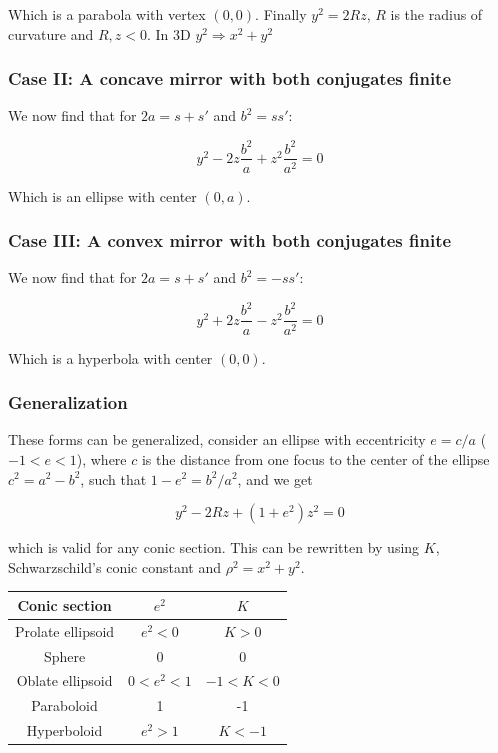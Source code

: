\documentclass[a4paper]{article}
\begin{document}
Which is a parabola with vertex $(0,0)$. Finally $y^2=2Rz$, $R$ is the radius of curvature and $R, z<0$. In 3D $y^2\Rightarrow x^2+y^2$ 

\subsubsection*{Case II: A concave mirror with both conjugates finite}

We now find that for $2a=s+s'$ and $b^2=ss'$:

\begin{equation}
    y^2-2z\frac{b^2}{a}+z^2\frac{b^2}{a^2}=0
\end{equation}

Which is an ellipse with center $(0, a)$.

\subsubsection*{Case III: A convex mirror with both conjugates finite}

We now find that for $2a=s+s'$ and $b^2=-ss'$:

\begin{equation}
    y^2+2z\frac{b^2}{a}-z^2\frac{b^2}{a^2}=0
\end{equation}

Which is a hyperbola with center $(0,0)$.

\subsubsection*{Generalization}

These forms can be generalized, consider an ellipse with eccentricity $e=c/a$ ($-1<e<1$), where $c$ is the distance from one focus to the center of the ellipse $c^2=a^2-b^2$, such that $1-e^2=b^2/a^2$, and we get

\begin{equation}
    y^2-2Rz+(1+e^2)z^2=0
\end{equation}

which is valid for any conic section. This can be rewritten by using $K$, Schwarzschild's conic constant and $\rho^2=x^2+y^2$.

\begin{table}[ht]
    \centering
    \begin{tabular}{c|c|c}
        Conic section & $e^2$ & $K$ \\
        
        \hline
        
        Prolate ellipsoid & $e^2 < 0$ & $K > 0$\\
        Sphere & 0 & 0 \\
        Oblate ellipsoid & $0<e^2<1$ & $-1<K<0$ \\
        Paraboloid & 1 & -1 \\
        Hyperboloid & $e^2 > 1$ & $ K < -1$
    \end{tabular}
\end{table}
\end{document}
